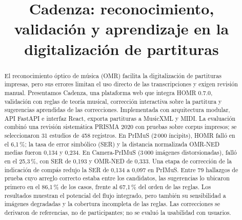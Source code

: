 \documentclass[conference]{IEEEtran}
\begin{document}
\title{Cadenza: reconocimiento, validación y aprendizaje en la
digitalización de partituras}

\author{
\and
{}
\and
{}
}

\maketitle

\begin{abstract}
El reconocimiento óptico de música (OMR) facilita la digitalización de partituras impresas, pero sus errores limitan el uso directo de las transcripciones y exigen revisión manual. Presentamos Cadenza, una plataforma web que integra HOMR 0.7.0, validación con reglas de teoría musical, corrección interactiva sobre la partitura y sugerencias aprendidas de las correcciones. Implementada con arquitectura modular, API FastAPI e interfaz React, exporta partituras a MusicXML y MIDI. La evaluación combinó una revisión sistemática PRISMA 2020 con pruebas sobre corpus impresos; se seleccionaron 31 estudios de 458 registros. En PrIMuS (2\,000 íncipits), HOMR falló en el 6,1\,\%; la tasa de error simbólico (SER) y la distancia normalizada OMR-NED medias fueron 0,134 y 0,234. En Camera-PrIMuS (3\,000 imágenes distorsionadas), falló en el 25,3\,\%, con SER de 0,193 y OMR-NED de 0,333. Una etapa de corrección de la indicación de compás redujo la SER de 0,134 a 0,097 en PrIMuS. Entre 79 hallazgos de prueba cuyo arreglo correcto estaba entre los candidatos, las sugerencias lo ubicaron primero en el 86,1\,\% de los casos, frente al 67,1\,\% del orden de las reglas. Los resultados muestran el potencial del flujo integrado, pero también su sensibilidad a imágenes degradadas y la cobertura incompleta de las reglas. Las correcciones se derivaron de referencias, no de participantes; no se evaluó la usabilidad con usuarios.
\end{abstract}
\end{document}

